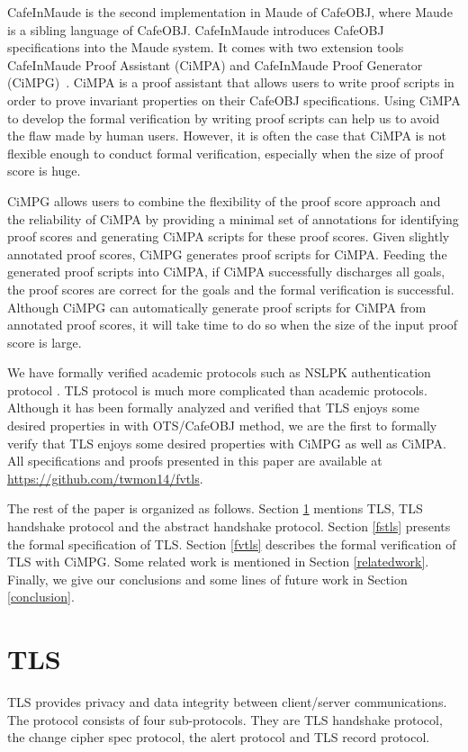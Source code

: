 \documentclass[a4paper,fleqn]{cas-dc}
\begin{document}
CafeInMaude is the second implementation in Maude of CafeOBJ, where Maude~\cite{ClavelEtal2007maude} is a sibling language of CafeOBJ.
CafeInMaude introduces CafeOBJ specifications into the Maude system.
It comes with two extension tools CafeInMaude Proof Assistant (CiMPA) and CafeInMaude Proof Generator (CiMPG)~\cite{RiescoO18tosem}. CiMPA is a proof assistant that allows users to write proof scripts in order to prove invariant properties on their CafeOBJ specifications. Using CiMPA to develop the formal verification by writing proof scripts can help us to avoid the flaw made by human users. However, it is often the case that CiMPA is not flexible enough to conduct formal verification, especially when the size of proof score is huge. 

CiMPG allows users to combine the flexibility of the proof score approach and the reliability of CiMPA by providing a minimal set of annotations for identifying proof scores and generating CiMPA scripts for these proof scores. Given slightly annotated proof scores, CiMPG generates proof scripts for CiMPA. Feeding the generated proof scripts into CiMPA, if CiMPA successfully discharges all goals, the proof scores are correct for the goals and the formal verification is successful. Although CiMPG can automatically generate proof scripts for CiMPA from annotated proof scores, it will take time to do so when the size of the input proof score is large.

We have formally verified academic protocols
such as NSLPK authentication protocol \cite{twmon}. TLS protocol is much more complicated than academic protocols. Although it has been formally analyzed and verified that TLS enjoys some desired properties in \cite{1437139} with OTS/CafeOBJ method, we are the first to formally verify that TLS enjoys some desired properties with CiMPG as  well as CiMPA. 
All specifications and proofs presented in this paper are available at \url{https://github.com/twmon14/fvtls}.

The rest of the paper is organized as follows. Section \ref{tls} mentions TLS, TLS handshake protocol and the abstract handshake protocol. Section \ref{fstls} presents the formal specification of TLS. Section \ref{fvtls} describes the formal verification of TLS with CiMPG. Some related work is mentioned in Section \ref{relatedwork}. Finally, we give our conclusions and some lines of future work in Section \ref{conclusion}.
	
\section{TLS}\label{tls}
TLS\cite{dierk} provides privacy and data integrity between client/server communications. The protocol consists of four sub-protocols. They are TLS handshake protocol, the change cipher spec protocol, the alert protocol and TLS record protocol. 
\end{document}
